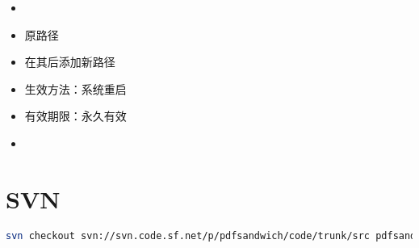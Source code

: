 \begin{itemize}
\item {}
\item 原路径 
\item 在其后添加新路径 
\item 生效方法：系统重启
\item 有效期限：永久有效
\item {}
\end{itemize}


\section{SVN}

\begin{lstlisting}[language=bash, caption={Download source files of PDFsandwich}]
svn checkout svn://svn.code.sf.net/p/pdfsandwich/code/trunk/src pdfsandwich
\end{lstlisting}
